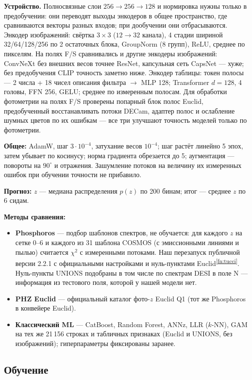 \documentclass[11pt,a4paper]{article}
\newcommand{\fnref}[1]{\textsuperscript{\ref{#1}}}
\begin{document}
\textbf{Устройство.} Полносвязные слои $256\to256\to128$ и нормировка нужны только в предобучении: они переводят выходы энкодеров в общее пространство, где сравниваются векторы разных входов; при дообучении они отбрасываются. Энкодер изображений: свёртка $3\times3$ ($12\to32$ канала), 4 стадии шириной 32/64/128/256 по 2 остаточных блока, GroupNorm (8 групп), ReLU, среднее по пикселям. На полях F/S сравнивались и другие энкодеры изображений: ConvNeXt без внешних весов точнее ResNet, капсульная сеть CapsNet — хуже; без предобучения CLIP точность заметно ниже. Энкодер таблицы: токен полосы — 2 числа + 18 чисел описания фильтра $\to$ MLP 128; Transformer $d=128$, 4 головы, FFN 256, GELU; среднее по измеренным полосам. Для обработки фотометрии на полях F/S проверены попарный блок полос Euclid, предобученный восстанавливать потоки DECam, адаптер полос и ослабление шумных цветов по их ошибкам — все три улучшают точность моделей только по фотометрии.

\textbf{Общее:} AdamW, шаг $3\cdot10^{-4}$, затухание весов $10^{-4}$; шаг растёт линейно 5 эпох, затем убывает по косинусу; норма градиента обрезается до 5; аугментация — повороты на $90^\circ$ и отражения. Зашумление потоков на величину их измеренных ошибок при обучении точности не прибавило.

\textbf{Прогноз:} $z$ — медиана распределения $p(z)$ по 200 бинам; итог — среднее $z$ по 6 сидам.


\textbf{Методы сравнения:}
\begin{itemize}
  \item \textbf{Phosphoros} — подбор шаблонов спектров, не обучается: для каждого $z$ на сетке 0–6 и каждого из 31 шаблона COSMOS (с эмиссионными линиями и пылью) считается $\chi^2$ с измеренными потоками. Наш перезапуск публичной версии 2.2.1 с официальными настройками и нуль-пунктами Euclid\fnref{fn:tucci}. Нуль-пункты UNIONS подобраны в том числе по спектрам DESI в поле N — информация из тестового поля, которой у нашей модели нет.
  \item \textbf{PHZ Euclid} — официальный каталог фото-$z$ Euclid Q1 (тот же Phosphoros в конвейере Euclid).
  \item \textbf{Классический ML} — CatBoost, Random Forest, ANNz, LLR ($k$-NN), GAM на тех же 21\,156 строках и табличных признаках (Euclid и UNIONS, без изображений); гиперпараметры фиксированы заранее.
\end{itemize}

\subsection{Обучение}
\end{document}
